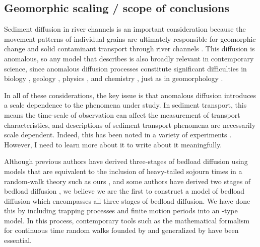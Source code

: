 \documentclass[]{agujournal2018}
\begin{document}
\subsection{Geomorphic scaling / scope of conclusions}
Sediment diffusion in river channels is an important consideration because the movement patterns of individual grains are ultimately responsible for geomorphic change \citep{Hassan2017} and solid contaminant transport through river channels \citep{Malmon2005, Macklin2006}.
This diffusion is anomalous, so any model that describes is also broadly relevant in contemporary science, since anomalous diffusion processes constitute significant difficulties in biology \citep[e.g.][]{Sokolov2012}, geology \citep[e.g.][]{Berkowitz2006}, physics \citep[e.g.][]{Metzler2000}, and chemistry \citep[e.g.][]{Metzler2014}, just as in geomorphology \citep[e.g.][]{Voller2010}.


In all of these considerations, the key issue is that anomalous diffusion introduces a scale dependence to the phenomena under study.
In sediment transport, this means the time-scale of observation can affect the measurement of transport characteristics, and descriptions of sediment transport phenomena are necessarily scale dependent.
Indeed, this has been noted in a variety of experiments \citep{Singh2009,Saletti2015,Campagnol2012}.
However, I need to learn more about it to write about it meaningfully.

Although previous authors have derived three-stages of bedload diffusion using models that are equivalent to the inclusion of heavy-tailed sojourn times in a random-walk theory such as ours \citep[e.g.][]{Zhang2012}, and some authors have derived two stages of bedload diffusion \citep[e.g.][]{Wu2019}, we believe we are the first to construct a model of bedload diffusion which encompasses all three stages of bedload diffusion.
We have done this by including trapping processes and finite motion periods into an \citet{Einstein1937}-type model.
In this process, contemporary tools such as the mathematical formalism for continuous time random walks founded by \citet{Montroll1965} and generalized by \citet{Weiss1976} have been essential.
\end{document}
